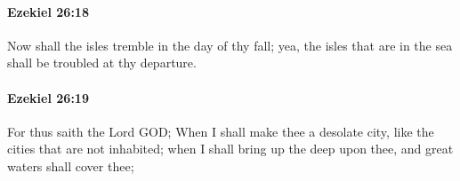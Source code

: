 		\paragraph{Ezekiel 26:18} %
			\label{EZEKIEL-26-18}

			Now shall the isles tremble in the day of thy fall; yea, the isles that are in the sea shall be troubled at thy departure.


		\paragraph{Ezekiel 26:19} %
			\label{EZEKIEL-26-19}

			For thus saith the Lord GOD; When I shall make thee a desolate city, like the cities that are not inhabited; when I shall bring up the deep upon thee, and great waters shall cover thee;


